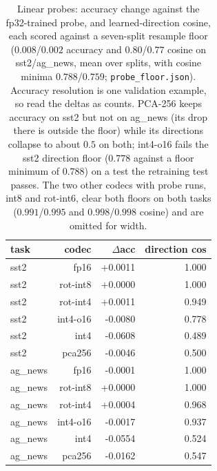 \begin{table}[htbp]
\caption{Linear probes: accuracy change against the fp32-trained probe, and learned-direction cosine, each scored against a seven-split resample floor ($0.008$/$0.002$ accuracy and $0.80$/$0.77$ cosine on sst2/ag\_news, mean over splits, with cosine minima $0.788$/$0.759$; \texttt{probe\_floor.json}). Accuracy resolution is one validation example, so read the deltas as counts. PCA-256 keeps accuracy on sst2 but not on ag\_news (its drop there is outside the floor) while its directions collapse to about $0.5$ on both; int4-o16 fails the sst2 direction floor ($0.778$ against a floor minimum of $0.788$) on a test the retraining test passes. The two other codecs with probe runs, int8 and rot-int6, clear both floors on both tasks ($0.991$/$0.995$ and $0.998$/$0.998$ cosine) and are omitted for width.}
\label{tab:probes}
\centering\small
\begin{tabular}{lrrr}
\toprule
task & codec & $\Delta$acc & direction cos \\
\midrule
sst2 & fp16 & +0.0011 & 1.000 \\
sst2 & rot-int8 & +0.0000 & 1.000 \\
sst2 & rot-int4 & +0.0011 & 0.949 \\
sst2 & int4-o16 & -0.0080 & 0.778 \\
sst2 & int4 & -0.0608 & 0.489 \\
sst2 & pca256 & -0.0046 & 0.500 \\
ag\_news & fp16 & -0.0001 & 1.000 \\
ag\_news & rot-int8 & +0.0000 & 1.000 \\
ag\_news & rot-int4 & +0.0004 & 0.968 \\
ag\_news & int4-o16 & -0.0017 & 0.937 \\
ag\_news & int4 & -0.0554 & 0.524 \\
ag\_news & pca256 & -0.0162 & 0.547 \\
\bottomrule
\end{tabular}
\end{table}

